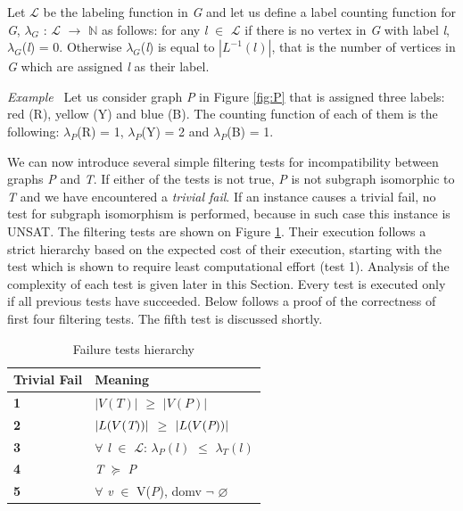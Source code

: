 \documentclass{l4proj}
\newcounter{example}[section]
\newenvironment{example}[1][]{\refstepcounter{example}\par\medskip
   \noindent \textit{Example~\theexample #1} \rmfamily}{\medskip}
\newcommand{\Lagr}{\mathcal{L}}
\begin{document}
Let $\Lagr$ be the labeling function in \emph{G} and let us define a label counting function for \emph{G}, $\lambda_{G}$ : $\Lagr$ $\rightarrow$ $\mathbb{N}$ as follows:
for any \emph{l} $\in$ $\Lagr$ if there is no vertex in \emph{G} with label \emph{l}, $\lambda_{G}$(\emph{l}) = 0. Otherwise $\lambda_{G}$(\emph{l}) is equal to $|L^{-1}(l)|$, that is the number of vertices in \emph{G} which are assigned \emph{l} as their label.

\begin{example}
Let us consider graph \emph{P} in Figure \ref{fig:P} that is assigned three labels: red (R), yellow (Y) and blue (B). The counting function of each of them is the following: $\lambda_{P}$(R) = 1, $\lambda_{P}$(Y) = 2 and $\lambda_{P}$(B) = 1.
\end{example}

We can now introduce several simple filtering tests for incompatibility between graphs \emph{P} and \emph{T}. If either of the tests is not true, \emph{P} is not subgraph isomorphic to \emph{T} and we have encountered a \emph{trivial fail}. If an instance causes a trivial fail, no test for subgraph isomorphism is performed, because in such case this instance is UNSAT. The filtering tests are shown on Figure \ref{table:failures}. Their execution follows a strict hierarchy based on the expected cost of their execution, starting with the test which is shown to require least computational effort (test 1). Analysis of the complexity of each test is given later in this Section. Every test is executed only if all previous tests have succeeded. Below follows a proof of the correctness of first four filtering tests. The fifth test is discussed shortly. 

\begin{table}[H]
\centering
\renewcommand{\arraystretch}{1.5}%
\begin{tabular}{ >{\centering\bfseries}m{1in} >{\centering\arraybackslash}m{2.3in}} 
\toprule
  Trivial Fail & Meaning\\
\midrule
 \textbf{1} & $|V (T)|$ $\geq$ $|V (P)|$\\
 \rowcolor{Gray}
 \textbf{2} & $|L(V(\emph{T}))|$ $\geq$ $|L(V(\emph{P}))|$\\
 \textbf{3} & $\forall$ \emph{l} $\in$ $\Lagr$: $\lambda_{P}(l)$ $\leq$ $\lambda_{T}(l)$\\
 \rowcolor{Gray}
 \textbf{4} & \emph{T} $\succeq$ \emph{P}\\
 \textbf{5} & $\forall$ \emph{v} $\in$ V(\emph{P}), domv $\neg$  $\varnothing$\\
 \bottomrule
\end{tabular}
\caption{Failure tests hierarchy}
\label{table:failures}
\end{table}        
\end{document}

